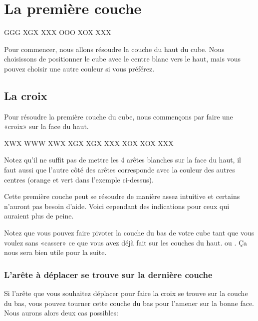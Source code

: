 \chapter{La première couche}

{
\centering
{}
\RubikFaceRight%
{G}{G}{G}%
{X}{G}{X}%
{X}{X}{X}
\RubikFaceFront%
{O}{O}{O}%
{X}{O}{X}%
{X}{X}{X}
\par
}
\medskip

Pour commencer, nous allons résoudre la couche du haut du cube. Nous choisissons de positionner
le cube avec le centre blanc vers le haut, mais vous pouvez choisir une autre couleur si vous préférez.


\section{La croix}

Pour résoudre la première couche du cube, nous commençons
par faire une «croix» sur la face du haut.

\begin{center}
\RubikFaceUp%
{X}{W}{X}%
{W}{W}{W}%
{X}{W}{X}
\RubikFaceRight%
{X}{G}{X}%
{X}{G}{X}%
{X}{X}{X}
\RubikFaceFront%
{X}{O}{X}%
{X}{O}{X}%
{X}{X}{X}
\end{center}

Notez qu'il ne suffit pas de mettre les 4 arêtes blanches sur la face du haut, il faut aussi
que l'autre côté des arêtes corresponde avec la couleur des autres centres (orange et vert dans l'exemple ci-dessus).

Cette première couche peut se résoudre de manière assez intuitive et certains n'auront pas besoin
d'aide. Voici cependant des indications pour ceux qui auraient plus de peine.

Notez que vous pouvez faire pivoter la couche du bas de votre cube tant que vous voulez sans «casser» ce que vous avez déjà fait sur les couches du haut.  ou . Ça nous sera bien utile pour la suite.

\subsection{L'arête à déplacer se trouve sur la dernière couche}
\label{subsec:c1d}

Si l'arête que vous souhaitez déplacer pour faire la croix se trouve sur la couche du bas, vous pouvez tourner cette couche du bas pour l'amener sur la bonne face. Nous aurons alors deux cas possibles:

